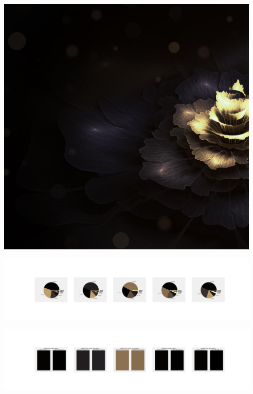 \documentclass[11pt]{article}
\begin{document}
\begin{landscape}
    \begin{center}
    \includegraphics[width=\textwidth]{./nbimg/file (106).jpg}
    \end{center}

    \begin{center}
    \includegraphics[width=250mm]{./nbimg/pie-8.jpg}
    \end{center}

    \begin{center}
    \includegraphics[width=250mm]{./nbimg/peak-8.jpg}
    \end{center}
    


\end{landscape}
\end{document}
